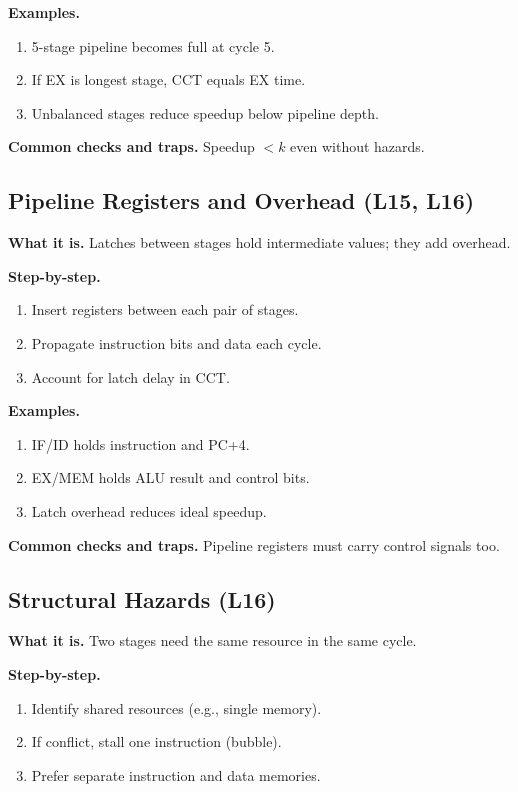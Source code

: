 \documentclass[11pt]{article}
\begin{document}
\textbf{Examples.}
\begin{enumerate}[leftmargin=*]
  \item 5-stage pipeline becomes full at cycle 5.
  \item If EX is longest stage, CCT equals EX time.
  \item Unbalanced stages reduce speedup below pipeline depth.
\end{enumerate}

\textbf{Common checks and traps.} Speedup $< k$ even without hazards.

\subsection{Pipeline Registers and Overhead (L15, L16)}
\textbf{What it is.} Latches between stages hold intermediate values; they add overhead.

\textbf{Step-by-step.}
\begin{enumerate}[leftmargin=*]
  \item Insert registers between each pair of stages.
  \item Propagate instruction bits and data each cycle.
  \item Account for latch delay in CCT.
\end{enumerate}

\textbf{Examples.}
\begin{enumerate}[leftmargin=*]
  \item IF/ID holds instruction and PC+4.
  \item EX/MEM holds ALU result and control bits.
  \item Latch overhead reduces ideal speedup.
\end{enumerate}

\textbf{Common checks and traps.} Pipeline registers must carry control signals too.

\subsection{Structural Hazards (L16)}
\textbf{What it is.} Two stages need the same resource in the same cycle.

\textbf{Step-by-step.}
\begin{enumerate}[leftmargin=*]
  \item Identify shared resources (e.g., single memory).
  \item If conflict, stall one instruction (bubble).
  \item Prefer separate instruction and data memories.
\end{enumerate}
\end{document}

